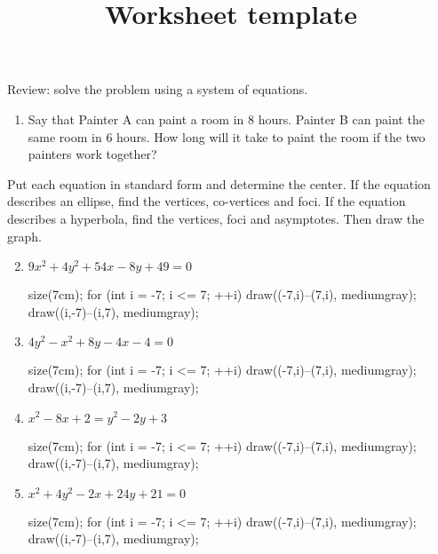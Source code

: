 \documentclass[12pt]{article}
\title{Worksheet template}
\begin{document}
\bigskip
\bigskip

Review: solve the problem using a system of equations.

\begin{enumerate}
	\item Say that Painter A can paint a room in 8 hours.  Painter B can paint the same room in 6 hours.
    How long will it take to paint the room if the two painters work together?
\end{enumerate}

Put each equation in standard form and determine the center.  If the equation describes an ellipse, find the vertices, co-vertices and foci.  If the equation describes a hyperbola, find the vertices, foci and asymptotes.  Then draw the graph.
\bigskip

\begin{enumerate}
\setcounter{enumi}{1}

	\item $9x^2 + 4y^2 + 54x - 8y + 49 = 0$
    
	\begin{flushright}
	\begin{asy}
	size(7cm);
	for (int i = -7; i <= 7; ++i)
	{
    	draw((-7,i)--(7,i), mediumgray);
	    draw((i,-7)--(i,7), mediumgray);
    }
	\end{asy}
	\end{flushright}

	\item $4y^2 - x^2 + 8y - 4x - 4 = 0$
    
	\begin{flushright}
	\begin{asy}
	size(7cm);
	for (int i = -7; i <= 7; ++i)
	{
    	draw((-7,i)--(7,i), mediumgray);
	    draw((i,-7)--(i,7), mediumgray);
    }
	\end{asy}
	\end{flushright}

\newpage

	\item $x^2 - 8x + 2 = y^2 - 2y + 3$
    
	\begin{flushright}
	\begin{asy}
	size(7cm);
	for (int i = -7; i <= 7; ++i)
	{
    	draw((-7,i)--(7,i), mediumgray);
	    draw((i,-7)--(i,7), mediumgray);
    }
	\end{asy}
	\end{flushright}

	\item $x^2 + 4y^2 - 2x + 24y + 21 = 0$
    
	\begin{flushright}
	\begin{asy}
	size(7cm);
	for (int i = -7; i <= 7; ++i)
	{
    	draw((-7,i)--(7,i), mediumgray);
	    draw((i,-7)--(i,7), mediumgray);
    }
	\end{asy}
	\end{flushright}
\end{enumerate}
\end{document}
